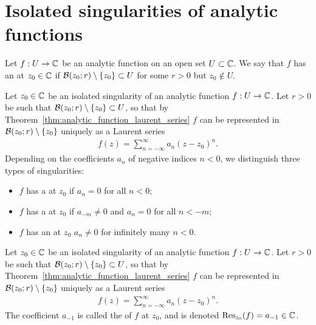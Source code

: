 \section{Isolated singularities of analytic functions}

\begin{definition}
  \label{def:isolated_singularity}
  Let $f : U \to \bC$ be an analytic function on an open set $U \subset \bC$.
  We say that $f$ has an  at $z_0 \in \bC$ if
  $\BallRC{r}{z_0} \setminus \set{z_0} \subset U$ for some $r>0$ but $z_0 \notin U$.
\end{definition}

\begin{definition}
  \label{def:singularity_classification}
  Let $z_0 \in \bC$ be an isolated singularity of
  an analytic function $f : U \to \bC$.
  Let $r > 0$ be such that $\BallRC{r}{z_0} \setminus \set{z_0} \subset U$,
  so that by Theorem~\ref{thm:analytic_function_laurent_series}
  $f$ can be represented in $\BallRC{r}{z_0} \setminus \set{z_0}$
  uniquely as a Laurent series
  \begin{align*}
    f(z) = \sum_{n=-\infty}^\infty a_n (z - z_0)^n .
  \end{align*}
  Depending on the coefficients $a_n$ of negative indices $n < 0$,
  we distinguish three types of singularities:
  \begin{itemize}
    \item $f$ has a  at $z_0$ if $a_n = 0$ for all $n < 0$;
    \item $f$ has a  at $z_0$
      if $a_{-m} \ne 0$ and $a_n = 0$ for all $n < -m$;
    \item $f$ has an  at $z_0$
      $a_n \ne 0$ for infinitely many $n < 0$.
  \end{itemize}
\end{definition}

\begin{definition}
  \label{def:residue}
  Let $z_0 \in \bC$ be an isolated singularity of
  an analytic function $f : U \to \bC$.
  Let $r > 0$ be such that $\BallRC{r}{z_0} \setminus \set{z_0} \subset U$,
  so that by Theorem~\ref{thm:analytic_function_laurent_series}
  $f$ can be represented in $\BallRC{r}{z_0} \setminus \set{z_0}$
  uniquely as a Laurent series
  \begin{align*}
    f(z) = \sum_{n=-\infty}^\infty a_n (z - z_0)^n .
  \end{align*}
  The coefficient $a_{-1}$ is called the  of $f$ at $z_0$,
  and is denoted $\ResAtOf{z_0}{f} = a_{-1} \in \bC$.
\end{definition}

